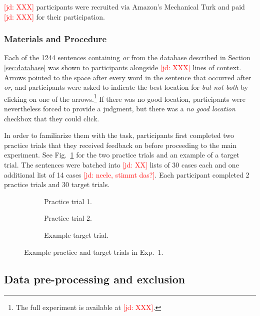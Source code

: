 \documentclass[11pt,letterpaper]{article}
\newcommand{\jd}[1]{\textcolor{Red}{[jd: #1]}}
\newcommand{\figref}[1]{Fig.~\ref{#1}}
\newcommand{\sectionref}[1]{Section \ref{#1}}
\begin{document}
\jd{XXX} participants were recruited via Amazon's Mechanical Turk and paid \jd{XXX} for their participation.

\subsubsection{Materials and Procedure}

Each of the 1244 sentences containing \emph{or} from the database described in \sectionref{sec:database} was shown to participants alongside \jd{XXX} lines of context. Arrows pointed to the space after every word in the sentence that occurred after \emph{or}, and participants were asked to indicate the best location for \emph{but not both} by clicking on one of the arrows.\footnote{The full experiment is available at \jd{XXX}.} If there was no good location, participants were nevertheless forced to provide a judgment, but there was a \emph{no good location} checkbox that they could click.

In order to familiarize them with the task, participants first completed two practice trials that they received feedback on before proceeding to the main experiment. See \figref{fig:exp1-task} for the two practice trials and an example of a target trial. The sentences were batched into \jd{XX} lists of 30 cases each and one additional list of 14 cases \jd{neele, stimmt das?}. Each participant completed 2 practice trials and 30 target trials.

\begin{figure}
\centering 
\begin{subfigure}{.7\textwidth}
\caption{Practice trial 1.}
\end{subfigure}

\begin{subfigure}{\textwidth}
\caption{Practice trial 2.}
\end{subfigure}

\begin{subfigure}{\textwidth}
\caption{Example target trial.}
\end{subfigure}

\caption{Example practice and target trials in Exp.~1.}
\label{fig:exp1-task}

\end{figure}

\subsection{Data pre-processing and exclusion}
\end{document}

